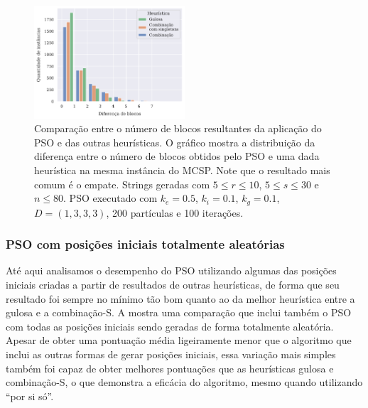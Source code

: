     \begin{figure}[htb]
        \centering
        \includegraphics[width=0.5\textwidth]{images/pso-diff.pdf}
        \caption{Comparação entre o número de blocos resultantes da aplicação do PSO e das outras heurísticas. O gráfico mostra a distribuição da diferença entre o número de blocos obtidos pelo PSO e uma dada heurística na mesma instância do MCSP. Note que o resultado mais comum é o empate. Strings geradas com $5 \leq r \leq 10$, $5 \leq s \leq 30$ e $n \leq 80$. PSO executado com $k_e = 0.5$, $k_i = 0.1$, $k_g = 0.1$, $D = (1, 3, 3, 3)$, 200 partículas e 100 iterações.}
        \label{fig:pso-diff}
    \end{figure}

    \subsubsection{PSO com posições iniciais totalmente aleatórias}

        Até aqui analisamos o desempenho do PSO utilizando algumas das posições iniciais criadas a partir de resultados de outras heurísticas, de forma que seu resultado foi sempre no mínimo tão bom quanto ao da melhor heurística entre a gulosa e a combinação-S. A  mostra uma comparação que inclui também o PSO com todas as posições iniciais sendo geradas de forma totalmente aleatória. Apesar de obter uma pontuação média ligeiramente menor que o algoritmo que inclui as outras formas de gerar posições iniciais, essa variação mais simples também foi capaz de obter melhores pontuações que as heurísticas gulosa e combinação-S, o que demonstra a eficácia do algoritmo, mesmo quando utilizando ``por si só''.

